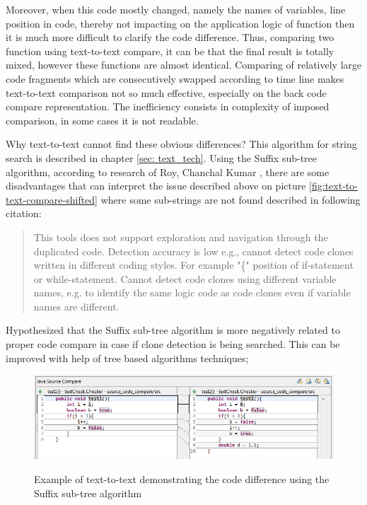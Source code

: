 \documentclass{report}
\begin{document}
Moreover, when this code mostly changed, namely the names of variables, line position in code, thereby not impacting on the application logic of function then it is much more difficult to clarify the code difference. Thus, comparing two function using text-to-text compare, it can be that the final result is totally mixed, however these functions are almost identical. Comparing of relatively large code fragments which are consecutively swapped according to time line makes text-to-text comparison not so much effective, especially on the back code compare representation. The inefficiency consists in complexity of imposed comparison, in some cases it is not readable. 

Why text-to-text cannot find these obvious differences? This algorithm for string search is described in chapter \ref{sec: text_tech}. Using the Suffix sub-tree algorithm,  according to research of Roy, Chanchal Kumar \cite{software_clone_detection}, there are some disadvantages that can interpret the issue described above on picture \ref{fig:text-to-text-compare-shifted} where some sub-strings are not found described in following citation:
\begin{quote} 
This tools does not support exploration and navigation through the duplicated code. Detection accuracy is low e.g., cannot detect code clones written in different coding styles. For example "\{" position of if-statement or while-statement. Cannot detect code clones using different variable names, e.g. to identify the same logic code as code clones even if variable names are different\cite{software_clone_detection}. 
\end{quote}

Hypothesized that the Suffix sub-tree algorithm is more negatively related to proper code compare in case if clone detection is being searched. This can be improved with help of tree based algorithms techniques;
\begin{figure}[h]
  \centering
  \includegraphics[width=1.00\textwidth]{Figures/text-to-text/text-compared-for-improve}\\[0.1cm]
  \caption[Text to text comparison example when lines of code are replaced]{Example of text-to-text demonstrating the code difference using the Suffix sub-tree algorithm }
  \label{fig:text-compared-for-improve}
\end{figure}
\end{document}
